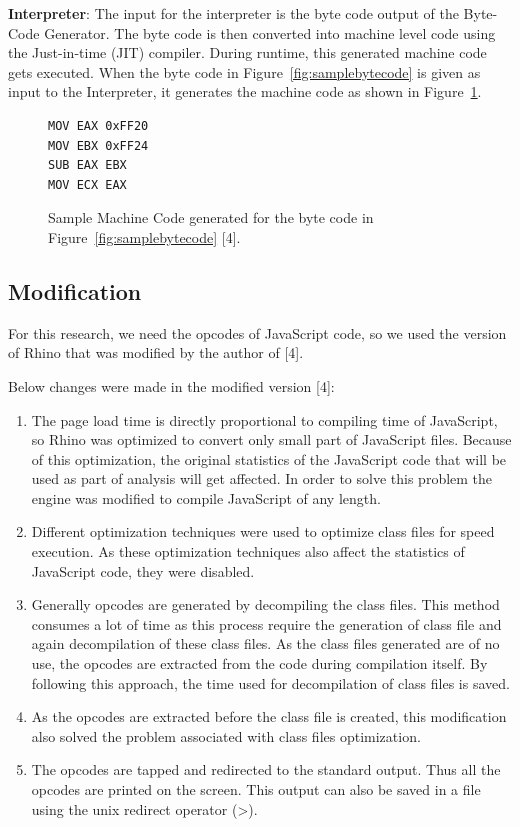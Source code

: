 \textbf{Interpreter}: The input for the interpreter is the byte code output of the Byte-Code Generator. The byte code is then converted into machine level code using the Just-in-time (JIT) compiler. During runtime, this generated machine code gets executed. When the byte code in Figure~\ref{fig:samplebytecode} is given as input to the Interpreter, it generates the machine code as shown in Figure~\ref{fig:samplemachinecode}. 
\begin{figure}
  \centering
\begin{lstlisting}[language=myasm] 
MOV EAX 0xFF20
MOV EBX 0xFF24
SUB EAX EBX
MOV ECX EAX
\end{lstlisting}
    \caption[Sample Machine Code]{Sample Machine Code generated for the byte code in Figure~\ref{fig:samplebytecode} [4].}
    \label{fig:samplemachinecode}
\end{figure}
\subsection{Modification}
For this research, we need the opcodes of JavaScript code, so we used the version of Rhino that was modified by the author of [4].
 
Below changes were made in the modified version [4]:

\begin{enumerate}
\item The page load time is directly proportional to compiling time of JavaScript, so Rhino was optimized to convert only small part of JavaScript files. Because of this optimization, the original statistics of the JavaScript code that will be used as part of analysis will get affected. In order to solve this problem the engine was modified to compile JavaScript of any length.
\item Different optimization techniques were used to optimize class files for speed execution. As these optimization techniques also affect the statistics of JavaScript code, they were disabled.
\item Generally opcodes are generated by decompiling the class files. This method consumes a lot of time as this process require the generation of class file and again decompilation of these class files. As the class files generated are of no use, the opcodes are extracted from the code during compilation itself. By following this approach, the time used for decompilation of class files is saved.
\item As the opcodes are extracted before the class file is created, this modification also solved the problem associated with class files optimization.
\item The opcodes are tapped and redirected to the standard output. Thus all the opcodes are printed on the screen. This output can also be saved in a file using the unix redirect operator (>).
\end{enumerate}
 

